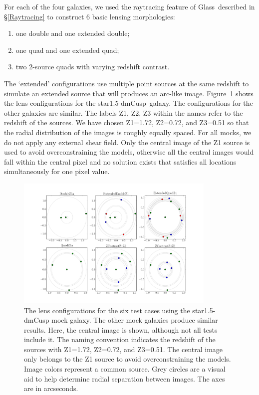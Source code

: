 \documentclass[galley,usenatbib]{mn2e}
\newcommand{\Glass}{{\sc Glass}}
\newcommand{\figref}[1] {Figure~\ref{#1}}
\newcommand{\secref}[1] {\S\ref{#1}}
\newcommand{\mockBC}{{\sc star1.5-dmCusp}}
\begin{document}
For each of the four galaxies, we used the raytracing feature of \Glass\
described in \secref{Raytracing} to construct 6 basic lensing morphologies:

\begin{enumerate}
\item one double and one extended double;
\item one quad and one extended quad;
\item two 2-source quads with varying redshift contrast.
\end{enumerate}
The `extended' configurations use multiple point sources at the same redshift
to simulate an extended source that will produces an arc-like image.
\figref{arrival surfaces} shows the lens configurations for the \mockBC\
galaxy. 
The configurations for the other galaxies are similar.  The labels Z1, Z2, Z3
within the names refer to the redshift of the sources. We have chosen Z1=1.72,
Z2=0.72, and Z3=0.51 so that the radial distribution of the images is roughly
equally spaced. For all mocks, we do not apply any external shear field.  Only
the central image of the Z1 source is used to avoid overconstraining the
models, otherwise all the central images would fall within the central pixel
and no solution exists that satisfies all locations simultaneously for one
pixel value.

\begin{figure}
\includegraphics[width=0.85\textwidth]{BCarrival_surfaces}
\caption{The lens configurations for the six test cases using the \mockBC{}
mock galaxy. The other mock galaxies produce similar results. Here, the central
image is shown, although not all tests include it. The naming convention
indicates the redshift of the sources with Z1=1.72, Z2=0.72, and Z3=0.51.  The
central image only belongs to the Z1 source to avoid overconstraining the
models. Image colors represent a common source. Grey circles are a visual aid
to help determine radial separation between images. The axes are in
arcseconds.}
\label{arrival surfaces}
\end{figure}
\end{document}
